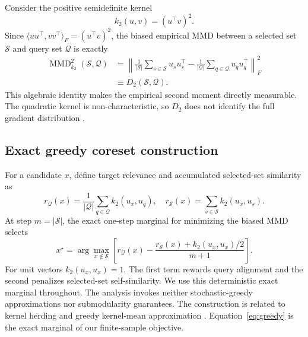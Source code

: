 \documentclass{article}
\newcommand{\dsecond}{D_2}
\begin{document}
Consider the positive semidefinite kernel
\begin{equation}
    k_2(u,v) = (u^\top v)^2.
\end{equation}
Since
$\langle uu^\top,vv^\top\rangle_F=(u^\top v)^2$, the biased empirical MMD
between a selected set $\mathcal{S}$ and query set $\mathcal{Q}$ is exactly
\citep{gretton2012mmd,muandet2017kme}
\begin{align}
    \operatorname{MMD}_{k_2}^2(\mathcal{S},\mathcal{Q})
    &=
    \left\|
    \frac{1}{|\mathcal{S}|}\sum_{s\in\mathcal{S}}u_su_s^\top
    -
    \frac{1}{|\mathcal{Q}|}\sum_{q\in\mathcal{Q}}u_qu_q^\top
    \right\|_F^2 \nonumber\\
    &\equiv \dsecond(\mathcal{S},\mathcal{Q}).
    \label{eq:mmd_identity}
\end{align}
This algebraic identity makes the empirical second moment directly measurable.
The quadratic kernel is non-characteristic, so $\dsecond$ does not identify
the full gradient distribution
\citep{sriperumbudur2011universality,muandet2017kme}.

\subsection{Exact greedy coreset construction}

For a candidate $x$, define target relevance and accumulated selected-set
similarity as
\begin{equation}
    r_{\mathcal Q}(x)=\frac{1}{|\mathcal Q|}
    \sum_{q\in\mathcal Q}k_2(u_x,u_q),
    \quad
    r_{\mathcal S}(x)=\sum_{s\in\mathcal S}k_2(u_x,u_s).
\end{equation}
At step $m=|\mathcal S|$, the exact one-step marginal for minimizing the biased
MMD selects
\begin{equation}
    x^\star =
    \arg\max_{x\notin\mathcal S}
    \left[
    r_{\mathcal Q}(x)
    -
    \frac{r_{\mathcal S}(x)+k_2(u_x,u_x)/2}{m+1}
    \right].
    \label{eq:greedy}
\end{equation}
For unit vectors $k_2(u_x,u_x)=1$. The first term rewards query alignment and
the second penalizes selected-set self-similarity. We use this deterministic
exact marginal throughout. The analysis invokes neither stochastic-greedy
approximations nor submodularity guarantees. The construction is related to
kernel herding and greedy kernel-mean approximation
\citep{chen2010herding,bach2012herding}.
Equation~\ref{eq:greedy} is the exact marginal of our finite-sample objective.
\end{document}

